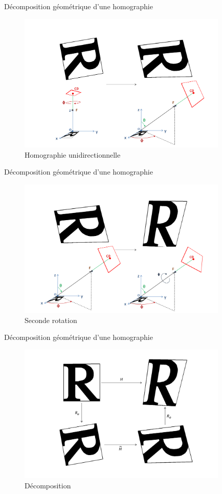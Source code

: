 \documentclass[c,12pt]{beamer}
\begin{document}
  \begin{frame}{Décomposition géométrique d'une homographie}
  \begin{figure}
   \centering
   \includegraphics[width=100mm]{beamer_decompo2_homo_part.png}
   \caption{Homographie unidirectionnelle}
  \end{figure}
  \end{frame}

  \begin{frame}{Décomposition géométrique d'une homographie}
  \begin{figure}
   \centering
   \includegraphics[width=100mm]{beamer_decompo3_rotation_psi.png}
   \caption{Seconde rotation}
  \end{figure}
  \end{frame}

  \begin{frame}{Décomposition géométrique d'une homographie}
  \begin{figure}
   \centering
   \includegraphics[width=100mm]{beamer_decompo_bilan.png}
   \caption{Décomposition}
  \end{figure}
  \end{frame}
\end{document}
